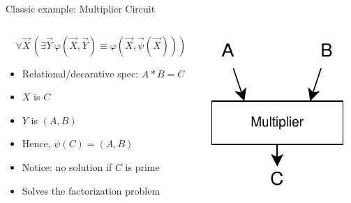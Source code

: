 \documentclass[aspectratio=169]{beamer}
\begin{document}
\begin{frame}{Classic example: Multiplier Circuit}
\begin{columns}
\begin{column}{0.48\textwidth}
        \[
            \forall \vec{X}\, \left( \exists \vec{Y}\, \varphi(\vec{X}, \vec{Y}) \equiv \varphi(\vec{X}, \vec{\psi}(\vec{X})) \right)
        \]
\begin{itemize}
    \item Relational/decarative spec: $A * B = C$
    \item $X$ is $C$
    \item $Y$ is $(A, B)$
    \item Hence, $\psi(C) = (A, B)$
    \item Notice: no solution if $C$ is prime
    \item Solves the factorization problem
\end{itemize}
\end{column}
\begin{column}{0.48\textwidth}
    \begin{center}
    \includegraphics[scale=1.2]{mult.pdf}
    \end{center}
\end{column}
\end{columns}

\end{frame}
\end{document}
